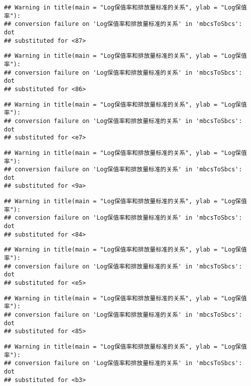 \documentclass[]{article}
\begin{document}
\begin{verbatim}
## Warning in title(main = "Log保值率和排放量标准的关系", ylab = "Log保值率"):
## conversion failure on 'Log保值率和排放量标准的关系' in 'mbcsToSbcs': dot
## substituted for <87>
\end{verbatim}

\begin{verbatim}
## Warning in title(main = "Log保值率和排放量标准的关系", ylab = "Log保值率"):
## conversion failure on 'Log保值率和排放量标准的关系' in 'mbcsToSbcs': dot
## substituted for <86>
\end{verbatim}

\begin{verbatim}
## Warning in title(main = "Log保值率和排放量标准的关系", ylab = "Log保值率"):
## conversion failure on 'Log保值率和排放量标准的关系' in 'mbcsToSbcs': dot
## substituted for <e7>
\end{verbatim}

\begin{verbatim}
## Warning in title(main = "Log保值率和排放量标准的关系", ylab = "Log保值率"):
## conversion failure on 'Log保值率和排放量标准的关系' in 'mbcsToSbcs': dot
## substituted for <9a>
\end{verbatim}

\begin{verbatim}
## Warning in title(main = "Log保值率和排放量标准的关系", ylab = "Log保值率"):
## conversion failure on 'Log保值率和排放量标准的关系' in 'mbcsToSbcs': dot
## substituted for <84>
\end{verbatim}

\begin{verbatim}
## Warning in title(main = "Log保值率和排放量标准的关系", ylab = "Log保值率"):
## conversion failure on 'Log保值率和排放量标准的关系' in 'mbcsToSbcs': dot
## substituted for <e5>
\end{verbatim}

\begin{verbatim}
## Warning in title(main = "Log保值率和排放量标准的关系", ylab = "Log保值率"):
## conversion failure on 'Log保值率和排放量标准的关系' in 'mbcsToSbcs': dot
## substituted for <85>
\end{verbatim}

\begin{verbatim}
## Warning in title(main = "Log保值率和排放量标准的关系", ylab = "Log保值率"):
## conversion failure on 'Log保值率和排放量标准的关系' in 'mbcsToSbcs': dot
## substituted for <b3>
\end{verbatim}
\end{document}
